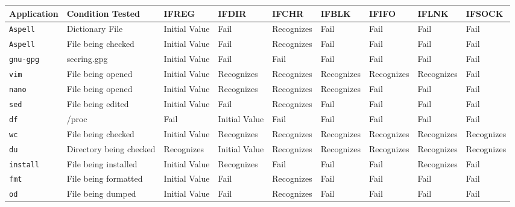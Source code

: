 \begin{table}[t]
    \scriptsize{}
    \begin{tabular}{l  l  |  l  l  l  l  l  l  l}
    \toprule{}
Application & Condition Tested           & IFREG        & IFDIR        &
        IFCHR     & IFBLK    & IFIFO      & IFLNK    & IFSOCK\\
\hline
        {\tt Aspell}      & Dictionary File            & Initial Value  & Fail           & Recognizes  & Fail       & Fail        & Fail       & Fail\\
        {\tt Aspell}      & File being checked         & Initial Value  & Fail           & Recognizes  & Fail       & Fail        & Fail       & Fail\\
        {\tt gnu-gpg}     & secring.gpg                & Initial Value  & Fail           & Fail        & Fail       & Fail        & Fail       & Fail\\
        {\tt vim}         & File being opened          & Initial Value  & Recognizes     & Recognizes  & Recognizes & Recognizes & Recognizes & Fail\\
        {\tt nano}        & File being opened          & Initial Value  & Recognizes     & Recognizes  & Recognizes & Fail        & Fail       & Fail\\
        {\tt sed}         & File being edited          & Initial Value  & Fail           & Recognizes  & Fail       & Fail        & Fail       & Fail\\
        {\tt df}          & /proc                      & Fail           & Initial Value  & Fail        & Fail       & Fail        & Fail       & Fail\\
        {\tt wc}          & File being checked         & Initial Value  & Recognizes     & Recognizes  & Recognizes & Recognizes  & Recognizes & Recognizes\\
        {\tt du}          & Directory being checked    & Recognizes     & Initial Value  & Recognizes  & Recognizes & Recognizes  & Recognizes & Recognizes\\
        {\tt install}     & File being installed       & Initial Value  & Recognizes     & Fail       & Fail      & Fail       & Recognizes & Fail\\
        {\tt fmt}         & File being formatted       & Initial Value  & Fail          & Recognizes  & Fail      & Fail       & Fail      & Fail\\
        {\tt od}          & File being dumped          & Initial Value  & Fail          & Recognizes  & Fail      & Fail       & Fail      & Fail\\

\end{tabular}
\end{table}
